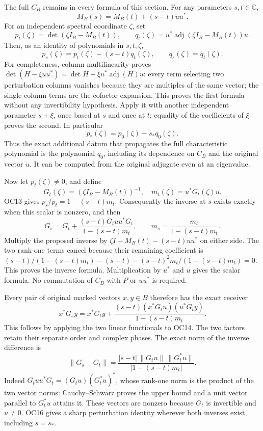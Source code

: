\documentclass[
]{article}
\begin{document}
The full \(C_B\) remains in every formula of this section. For any
parameters \(s,t\in\mathbb C\), \[
M_B(s)=M_B(t)+(s-t)uu^*.
\tag{OC12}
\] For an independent spectral coordinate \(\zeta\), set \[
p_t(\zeta)=\det(\zeta I_B-M_B(t)),\qquad
q_t(\zeta)=u^*\operatorname{adj}(\zeta I_B-M_B(t))u.
\] Then, as an identity of polynomials in \(s,t,\zeta\), \[
\boxed{p_s(\zeta)=p_t(\zeta)-(s-t)q_t(\zeta),\qquad q_s(\zeta)=q_t(\zeta).}
\tag{OC13}
\] For completeness, column multilinearity proves
\(\det(H-\xi uu^*)=\det H-\xi u^*\operatorname{adj}(H)u\): every term
selecting two perturbation columns vanishes because they are multiples
of the same vector; the single-column terms are the cofactor expansion.
This proves the first formula without any invertibility hypothesis.
Apply it with another independent parameter \(s+\xi\), once based at
\(s\) and once at \(t\); equality of the coefficients of \(\xi\) proves
the second. In particular \[
p_*(\zeta)=p_0(\zeta)-s_*q_0(\zeta).
\] Thus the exact additional datum that propagates the full
characteristic polynomial is the polynomial \(q_0\), including its
dependence on \(C_B\) and the original vector \(u\). It can be computed
from the original adjugate even at an eigenvalue.

Now let \(p_t(\zeta)\ne0\), and define \[
G_t(\zeta)=(\zeta I_B-M_B(t))^{-1},\quad
m_t(\zeta)=u^*G_t(\zeta)u.
\] OC13 gives \(p_s/p_t=1-(s-t)m_t\). Consequently the inverse at \(s\)
exists exactly when this scalar is nonzero, and then \[
\boxed{G_s=G_t+
\frac{(s-t)G_tu u^*G_t}{1-(s-t)m_t},\qquad
m_s=\frac{m_t}{1-(s-t)m_t}.}
\tag{OC14}
\] Multiply the proposed inverse by \(\zeta I-M_B(t)-(s-t)uu^*\) on
either side. The two rank-one terms cancel because their remaining
coefficient is \((s-t)/(1-(s-t)m_t)-(s-t)-(s-t)^2m_t/(1-(s-t)m_t)=0\).
This proves the inverse formula. Multiplication by \(u^*\) and \(u\)
gives the scalar formula. No commutation of \(C_B\) with \(P\) or
\(uu^*\) is required.

Every pair of original marked vectors \(x,y\in B\) therefore has the
exact receiver \[
x^*G_s y=x^*G_t y+
\frac{(s-t)(x^*G_tu)(u^*G_ty)}{1-(s-t)m_t}.
\tag{OC15}
\] This follows by applying the two linear functionals to OC14. The two
factors retain their separate order and complex phases. The exact norm
of the inverse difference is \[
\boxed{\|G_s-G_t\|=
\frac{|s-t|\,\|G_tu\|\,\|G_t^*u\|}{|1-(s-t)m_t|}.}
\tag{OC16}
\] Indeed \(G_tu u^*G_t=(G_tu)(G_t^*u)^*\), whose rank-one norm is the
product of the two vector norms: Cauchy--Schwarz proves the upper bound
and a unit vector parallel to \(G_t^*u\) attains it. These vectors are
nonzero because \(G_t\) is invertible and \(u\ne0\). OC16 gives a sharp
perturbation identity wherever both inverses exist, including \(s=s_*\).
\end{document}
